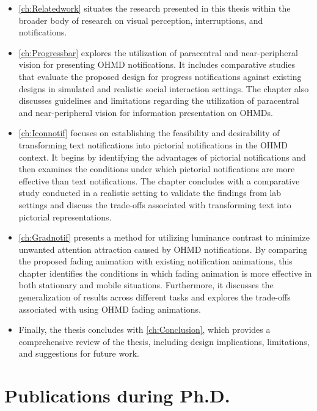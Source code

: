 \begin{itemize}
    \item \autoref{ch:Relatedwork} situates the research presented in this thesis within the broader body of research on visual perception, interruptions, and notifications.
    
    \item \autoref{ch:Progressbar} explores the utilization of paracentral and near-peripheral vision for presenting OHMD notifications. It includes comparative studies that evaluate the proposed design for progress notifications against existing designs in simulated and realistic social interaction settings. The chapter also discusses guidelines and limitations regarding the utilization of paracentral and near-peripheral vision for information presentation on OHMDs.
    
    \item \autoref{ch:Iconnotif} focuses on establishing the feasibility and desirability of transforming text notifications into pictorial notifications in the OHMD context. It begins by identifying the advantages of pictorial notifications and then examines the conditions under which pictorial notifications are more effective than text notifications. The chapter concludes with a comparative study conducted in a realistic setting to validate the findings from lab settings and discuss the trade-offs associated with transforming text into pictorial representations.
    
    \item \autoref{ch:Gradnotif} presents a method for utilizing luminance contrast to minimize unwanted attention attraction caused by OHMD notifications. By comparing the proposed fading animation with existing notification animations, this chapter identifies the conditions in which fading animation is more effective in both stationary and mobile situations. Furthermore, it discusses the generalization of results across different tasks and explores the trade-offs associated with using OHMD fading animations.
    
    \item Finally, the thesis concludes with \autoref{ch:Conclusion}, which provides a comprehensive review of the thesis, including design implications, limitations, and suggestions for future work.
    
\end{itemize}




\section{Publications during Ph.D.}
\label{sec:Intro:publications}

